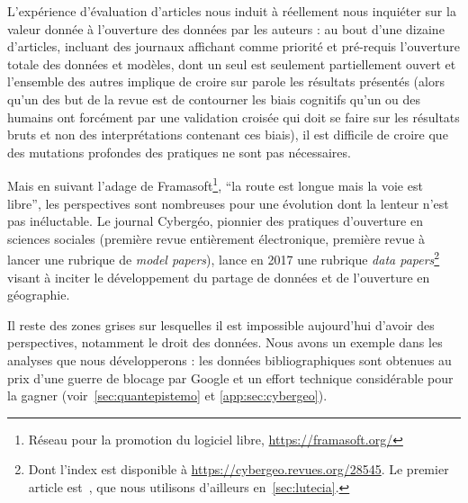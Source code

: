 L'expérience d'évaluation d'articles nous induit à réellement nous inquiéter sur la valeur donnée à l'ouverture des données par les auteurs : au bout d'une dizaine d'articles, incluant des journaux affichant comme priorité et pré-requis l'ouverture totale des données et modèles, dont un seul est seulement partiellement ouvert et l'ensemble des autres implique de croire sur parole les résultats présentés (alors qu'un des but de la revue est de contourner les biais cognitifs qu'un ou des humains ont forcément par une validation croisée qui doit se faire sur les résultats bruts et non des interprétations contenant ces biais), il est difficile de croire que des mutations profondes des pratiques ne sont pas nécessaires.


Mais en suivant l'adage de Framasoft\footnote{Réseau pour la promotion du logiciel libre, \url{https://framasoft.org/}}, ``la route est longue mais la voie est libre'', les perspectives sont nombreuses pour une évolution dont la lenteur n'est pas inéluctable. Le journal Cybergéo, pionnier des pratiques d'ouverture en sciences sociales (première revue entièrement électronique, première revue à lancer une rubrique de \emph{model papers}), lance en 2017 une rubrique \emph{data papers}\footnote{Dont l'index est disponible à \url{https://cybergeo.revues.org/28545}. Le premier article est~\cite{swerts2017database}, que nous utilisons d'ailleurs en~\ref{sec:lutecia}.} visant à inciter le développement du partage de données et de l'ouverture en géographie.


Il reste des zones grises sur lesquelles il est impossible aujourd'hui d'avoir des perspectives, notamment le droit des données. Nous avons un exemple dans les analyses que nous développerons : les données bibliographiques sont obtenues au prix d'une guerre de blocage par Google et un effort technique considérable pour la gagner (voir~\ref{sec:quantepistemo} et \ref{app:sec:cybergeo}).%


